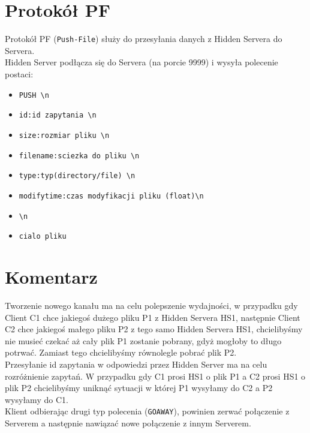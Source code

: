\documentclass[a4paper,notitlepage]{article}
\begin{document}
\section{Protokół PF}
Protokół PF (\texttt{Push-File}) służy do przesyłania danych z Hidden Servera do Servera. \\
Hidden Server podłącza się do Servera (na porcie 9999) i wysyła polecenie postaci:
\begin{itemize}
        \item \texttt{PUSH \textbackslash n}
        \item \texttt{id:id zapytania \textbackslash n}
        \item \texttt{size:rozmiar pliku \textbackslash n}
        \item \texttt{filename:sciezka do pliku \textbackslash n}
        \item \texttt{type:typ(directory/file) \textbackslash n}
        \item \texttt{modifytime:czas modyfikacji pliku (float)\textbackslash n}
        \item \texttt{\textbackslash n}
        \item \texttt{cialo pliku}
    \end{itemize}

\section{Komentarz}
Tworzenie nowego kanału ma na celu polepszenie wydajności, w przypadku gdy Client C1 chce jakiegoś dużego pliku P1 z Hidden Servera HS1, następnie Client C2 chce jakiegoś małego pliku P2 z tego samo Hidden Servera HS1, chcielibyśmy nie musieć czekać aż cały plik P1 zostanie pobrany, gdyż mogłoby to długo potrwać. Zamiast tego chcielibyśmy równolegle pobrać plik P2. \\
Przesyłanie id zapytania w odpowiedzi przez Hidden Server ma na celu rozróżnienie zapytań. W przypadku gdy C1 prosi HS1 o plik P1 a C2 prosi HS1 o plik P2 chcielibyśmy uniknąć sytuacji w której P1 wysyłamy do C2 a P2 wysyłamy do C1. \\
Klient odbierając drugi typ polecenia (\texttt{GOAWAY}), powinien zerwać połączenie z Serverem a następnie nawiązać nowe połączenie z innym Serverem.




   
\end{document}
